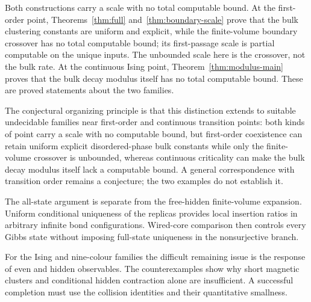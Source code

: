 \begin{remark}
Both constructions carry a scale with no total computable bound. At the first-order point, Theorems~\ref{thm:full} and~\ref{thm:boundary-scale} prove that the bulk clustering constants are uniform and explicit, while the finite-volume boundary crossover has no total computable bound; its first-passage scale is partial computable on the unique inputs. The unbounded scale here is the crossover, not the bulk rate. At the continuous Ising point, Theorem~\ref{thm:modulus-main} proves that the bulk decay modulus itself has no total computable bound. These are proved statements about the two families.

The conjectural organizing principle is that this distinction extends to suitable undecidable families near first-order and continuous transition points: both kinds of point carry a scale with no computable bound, but first-order coexistence can retain uniform explicit disordered-phase bulk constants while only the finite-volume crossover is unbounded, whereas continuous criticality can make the bulk decay modulus itself lack a computable bound. A general correspondence with transition order remains a conjecture; the two examples do not establish it.
\end{remark}

The all-state argument is separate from the free-hidden finite-volume expansion. Uniform conditional uniqueness of the replicas provides local insertion ratios in arbitrary infinite bond configurations. Wired-core comparison then controls every Gibbs state without imposing full-state uniqueness in the nonsurjective branch.

For the Ising and nine-colour families the difficult remaining issue is the response of even and hidden observables. The counterexamples show why short magnetic clusters and conditional hidden contraction alone are insufficient. A successful completion must use the collision identities and their quantitative smallness.

